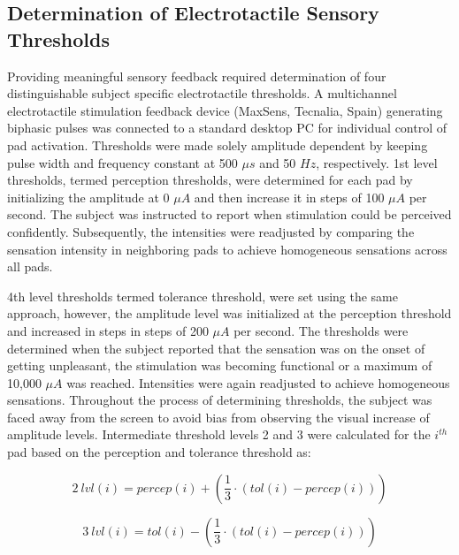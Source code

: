 
\subsection{Determination of Electrotactile Sensory Thresholds}


Providing meaningful sensory feedback required determination of four distinguishable subject specific electrotactile thresholds. A multichannel electrotactile stimulation feedback device (MaxSens, Tecnalia, Spain) generating biphasic pulses was connected to a standard desktop PC for individual control of pad activation. Thresholds were made solely amplitude dependent by keeping pulse width and frequency constant at 500 $\mu s$ and 50 $Hz$, respectively.  1st level thresholds, termed perception thresholds, were determined for each pad by initializing the amplitude at 0 $\mu A$ and then increase it in steps of 100 $\mu A$ per second. The subject was instructed to report when stimulation could be perceived confidently. Subsequently, the intensities were readjusted by comparing the sensation intensity in neighboring pads to achieve homogeneous sensations across all pads. 

4th level thresholds termed tolerance threshold, were set using the same approach, however, the amplitude level was initialized at the perception threshold and increased in steps in steps of 200 $\mu A$ per second. The thresholds were determined when the subject reported that the sensation was on the onset of getting unpleasant, the stimulation was becoming functional or a maximum of 10,000 $\mu A$ was reached. Intensities were again readjusted to achieve homogeneous sensations. Throughout the process of determining thresholds, the subject was faced away from the screen to avoid bias from observing the visual increase of amplitude levels. Intermediate threshold levels 2 and 3 were calculated for the $i^{th}$ pad based on the perception and tolerance threshold as: 

	\begin{equation}
	2~lvl(i) = percep(i) + (\frac{1}{3} \cdot (tol(i) - percep(i)))
	\end{equation}

	\begin{equation}
	3~lvl(i) = tol(i) - (\frac{1}{3} \cdot (tol(i) - percep(i)))
	\end{equation}
